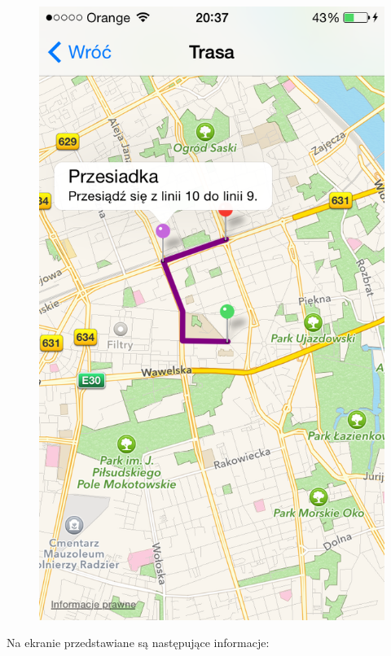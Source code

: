 \documentclass[a4paper,12pt]{article}
\begin{document}
\begin{figure}[ht!]
\begin{minipage}{.45\textwidth}
			\centering
  			\includegraphics[width=\linewidth, height=.4\textheight,keepaspectratio]{graphics/snapshots/result_screen_two.png}
  			\label{fig:result_screen_two}
		\end{minipage}
	\end{figure}

	Na ekranie przedstawiane są następujące informacje:
\end{document}
